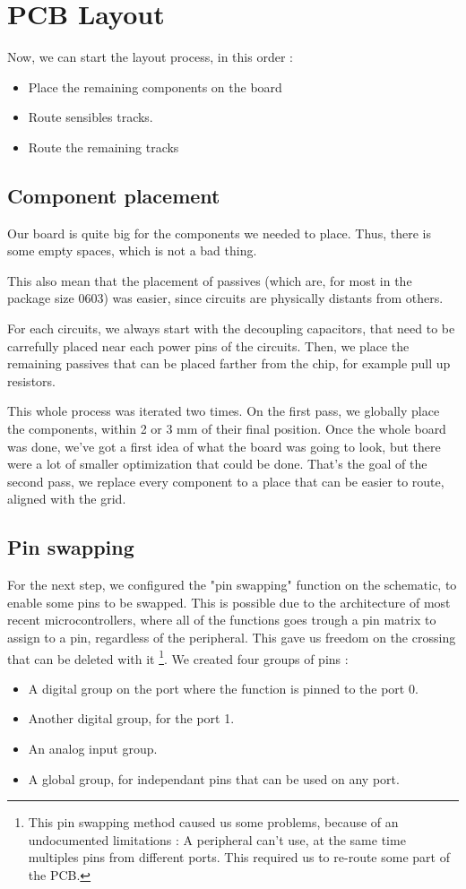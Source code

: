 \section{PCB Layout}
Now, we can start the layout process, in this order :

\begin{itemize}
    \item   Place the remaining components on the board
    \item   Route sensibles tracks.
    \item   Route the remaining tracks
\end{itemize}

\subsection{Component placement}
Our board is quite big for the components we needed to place. Thus, there is some empty spaces,
which is not a bad thing.

This also mean that the placement of passives (which are, for most in the package size 0603) was
easier, since circuits are physically distants from others.

For each circuits, we always start with the decoupling capacitors, that need to be carrefully
placed near each power pins of the circuits. Then, we place the remaining passives that can
be placed farther from the chip, for example pull up resistors.

This whole process was iterated two times. On the first pass, we globally place the components,
within 2 or 3 mm of their final position. Once the whole board was done, we've got a first idea
of what the board was going to look, but there were a lot of smaller optimization that could be
done. That's the goal of the second pass, we replace every component to a place that can be easier
to route, aligned with the grid.

\subsection{Pin swapping}
For the next step, we configured the "pin swapping" function on the schematic, to enable some pins
to be swapped. This is possible due to the architecture of most recent microcontrollers, where all
of the functions goes trough a pin matrix to assign to a pin, regardless of the peripheral. This
gave us freedom on the crossing that can be deleted with it \footnote{
    This pin swapping method caused us some problems, because of an undocumented limitations : A
    peripheral can't use, at the same time multiples pins from different ports. This required
    us to re-route some part of the PCB.
}.
We created four groups of pins :
\begin{itemize}
    \item   A digital group on the port where the function is pinned to the port 0.
    \item   Another digital group, for the port 1.
    \item   An analog input group.
    \item   A global group, for independant pins that can be used on any port.
\end{itemize}


